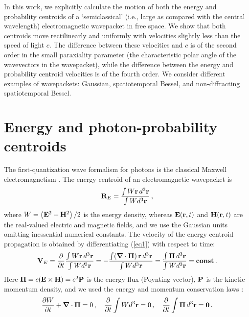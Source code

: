\documentclass[12pt, a4paper, superscriptaddress, final]{iopart}
\begin{document}
In this work, we explicitly calculate the motion of both the energy and probability centroids of a `semiclassical' (i.e., large as compared with the central wavelength) electromagnetic wavepacket in free space. We show that both centroids move rectilinearly and uniformly with velocities slightly less than the speed of light $c$. The difference between these velocities and $c$ is of the second order in the small paraxiality parameter (the characteristic polar angle of the wavevectors in the wavepacket), while the difference between the energy and probability centroid velocities is of the fourth order. We consider different examples of wavepackets: Gaussian, spatiotemporal Bessel, and non-diffracting spatiotemporal Bessel.

\section{Energy and photon-probability centroids}

The first-quantization wave formalism for photons is the classical Maxwell electromagnetism \cite{Laporte1931, Oppenheimer1931, BB1996}. The energy centroid of an electromagnetic wavepacket is
%
\begin{equation}
\label{eq1}
{\bf R}_E = \frac{\int W{\bf r}\, d^3{\bf r}}{\int W d^3{\bf r} } \,,
\end{equation}
%
where $W = \left({\bf E}^2+{\bf H}^2\right)/2$ is the energy density, whereas ${\bf E}({\bf r},t)$ and ${\bf H}({\bf r},t)$ are the real-valued electric and magnetic fields, and we use the Gaussian units omitting inessential numerical constants. The velocity of the energy centroid propagation is obtained by differentiating (\ref{eq1}) with respect to time:
%
\begin{equation}
\label{eq2}
{\bf V}_E =
\frac{\partial}{\partial t}\frac{\int W{\bf r}\, d^3{\bf r}}{\int W d^3{\bf r} } = - \frac{\int ({\bm \nabla} \cdot {\bm \Pi})\, {\bf r}\, d^3{\bf r}}{\int W d^3{\bf r} } = \frac{\int {\bf \Pi}\, d^3{\bf r}}{\int W d^3{\bf r} } = {\bf const} \,.
\end{equation}
%
Here ${\bf \Pi} = c({\bf E}\times{\bf H}) = c^2{\bf P}$ is the energy flux (Poynting vector), ${\bf P}$ is the   kinetic momentum density, and we used the energy and momentum conservation laws \cite{LLfield, Jackson}:  
%
\begin{equation}
\label{eq3}
\frac{\partial W}{\partial t} + {\bm \nabla} \cdot {\bm \Pi} = 0 \,, \quad
\frac{\partial}{\partial t} \int W d^3{\bf r} = 0\,, \quad 
\frac{\partial}{\partial t} \int {\bm \Pi} \,d^3{\bf r} = {\bf 0}\,.
\end{equation}
%	
\end{document}
